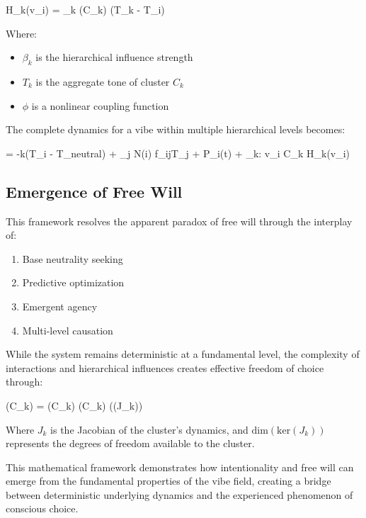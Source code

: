 \documentclass{article}
\let\oldequation\equation
\let\endoldequation\endequation
\renewenvironment{equation}{%
    \noindent\vspace{-\parskip}\vspace{-\baselineskip}%
    \oldequation
}{%
    \endoldequation
    \noindent\vspace{-\parskip}\vspace{-\baselineskip}%
}
\theoremstyle{definition}
\theoremstyle{axiom}
\theoremstyle{theorem}
\theoremstyle{proposition}
\begin{document}
\begin{equation}
H_k(v_i) = \beta_k \cdot {}(C_k) \cdot \phi(T_k - T_i)
\end{equation}

Where:
\begin{itemize}
\item $\beta_k$ is the hierarchical influence strength
\item $T_k$ is the aggregate tone of cluster $C_k$
\item $\phi$ is a nonlinear coupling function
\end{itemize}

The complete dynamics for a vibe within multiple hierarchical levels becomes:

\begin{equation}
 = -k(T_i - T_{neutral}) + \sum_{j \in N(i)} f_{ij}T_j + P_i(t) + \sum_{k: v_i \in C_k} H_k(v_i)
\end{equation}

\subsection{Emergence of Free Will}

This framework resolves the apparent paradox of free will through the interplay of:

\begin{enumerate}
\item Base neutrality seeking
\item Predictive optimization
\item Emergent agency
\item Multi-level causation
\end{enumerate}

While the system remains deterministic at a fundamental level, the complexity of interactions and hierarchical influences creates effective freedom of choice through:

\begin{equation}
(C_k) = (C_k) \cdot {}(C_k) \cdot {}((J_k))
\end{equation}

Where $J_k$ is the Jacobian of the cluster's dynamics, and $\text{dim}(\text{ker}(J_k))$ represents the degrees of freedom available to the cluster.

This mathematical framework demonstrates how intentionality and free will can emerge from the fundamental properties of the vibe field, creating a bridge between deterministic underlying dynamics and the experienced phenomenon of conscious choice.
\end{document}
